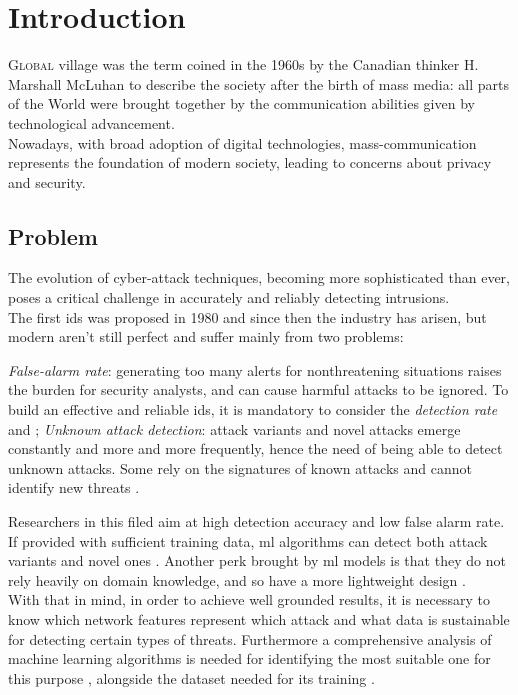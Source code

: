 \chapter{Introduction}
\label{chap:intro}

\lettrine[lines=3, findent=3pt, nindent=0pt]{G}{lobal} village was the term coined in the 1960s by the Canadian thinker H. Marshall McLuhan \cite{mcluhan1962} to describe the society after the birth of mass media: all parts of the World were brought together by the communication abilities given by technological advancement. \\
Nowadays, with broad adoption of digital technologies, mass-communication represents the foundation of modern society, leading to concerns about privacy and security.




\section{Problem}
\label{sec:problem}

The evolution of cyber-attack techniques, becoming more sophisticated than ever, poses a critical challenge in accurately and reliably detecting intrusions.\\ The first \gls{ids} was proposed in 1980 \cite{Andreson1980} and since then the industry has arisen, but modern  aren't still perfect and suffer mainly from two problems:
\begin{itemize}
    \itemAR \textit{False-alarm rate}: generating too many alerts for nonthreatening situations raises the burden for security analysts, and can cause harmful attacks to be ignored. To build an effective and reliable \gls{ids}, it is mandatory to consider the \textit{detection rate} \cite{Axelsson2000} and \cite{Liu2019};
    \itemAR \textit{Unknown attack detection}: attack variants and novel attacks emerge constantly and more and more frequently, hence the need of being able to detect unknown attacks. Some  rely on the signatures of known attacks and cannot identify new threats \cite{Hodo2017}.
\end{itemize}
Researchers in this filed aim at high detection accuracy and low false alarm rate. \\
If provided with sufficient training data, \gls{ml} algorithms can detect both attack variants and novel ones \cite{Hodo2017}. Another perk brought by \gls{ml} models is that they do not rely heavily on domain knowledge, and so have a more lightweight design \cite{Khraisat2019}. \\ With that in mind, in order to achieve well grounded results, it is necessary to know which network features represent which attack \cite{Iglesias2015} and what data is sustainable for detecting certain types of threats. Furthermore a comprehensive analysis of machine learning algorithms is needed for identifying the most suitable one for this purpose \cite{Liu2019}, alongside the dataset needed for its training \cite{Sharafaldin2019}.

